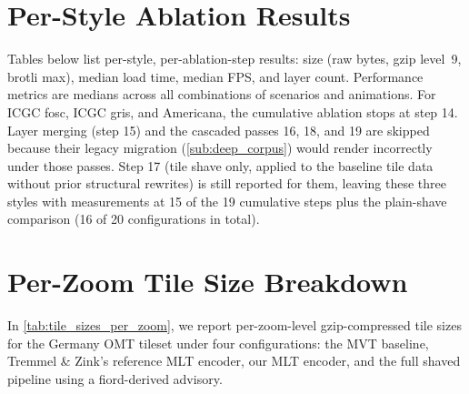 \section{Per-Style Ablation Results}\label{sec:app_per_style}

Tables below list per-style, per-ablation-step results: size (raw bytes, gzip level~9, brotli max), median load time, median \ac{FPS}, and layer count.
Performance metrics are medians across all combinations of scenarios and animations.
For ICGC fosc, ICGC gris, and Americana, the cumulative ablation stops at step 14.
Layer merging (step 15) and the cascaded passes 16, 18, and 19 are skipped because their legacy  migration (\cref{sub:deep_corpus}) would render incorrectly under those passes.
Step 17 (tile shave only, applied to the baseline tile data without prior structural rewrites) is still reported for them, leaving these three styles with measurements at 15 of the 19 cumulative steps plus the plain-shave comparison (16 of 20 configurations in total).


\clearpage

\section{Per-Zoom Tile Size Breakdown}\label{app_tile_sizes}

In \cref{tab:tile_sizes_per_zoom}, we report per-zoom-level gzip-compressed tile sizes for the Germany \ac{OMT} tileset under four configurations: the \ac{MVT} baseline, Tremmel \& Zink's reference \ac{MLT} encoder, our \ac{MLT} encoder, and the full shaved pipeline using a fiord-derived advisory.


